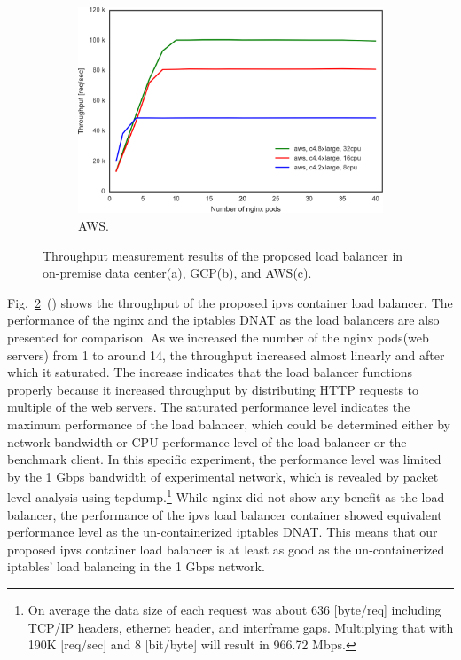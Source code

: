 \begin{figure}[h]
  \begin{subfigure}[t]{\columnwidth}
    \includegraphics[width=0.9\columnwidth]{Figs/aws_c4_ieice}
    \caption{AWS.}
    \label{fig:aws_c4_ieice}
  \end{subfigure}

  \caption{Throughput measurement results of the proposed load balancer in on-premise data center(a), GCP(b), and AWS(c).
}
  \label{fig:ipvs_performance}

\end{figure}


Fig.~\ref{fig:ipvs_performance}~() shows the throughput of the proposed ipvs container load balancer.
The performance of the nginx and the iptables DNAT as the load balancers are also presented for comparison.
As we increased the number of the nginx pods(web servers) from 1 to around 14, the throughput increased almost linearly and after which it saturated.
The increase indicates that the load balancer functions properly because it increased throughput by distributing HTTP requests to multiple of the web servers.
The saturated performance level indicates the maximum performance of the load balancer, which could be determined either by network bandwidth or CPU performance level of the load balancer or the benchmark client.
In this specific experiment, the performance level was limited by the 1 Gbps bandwidth of experimental network\cite{takahashi2018portable}, which is revealed by packet level analysis using tcpdump.\footnote{
On average the data size of each request was about 636 [byte/req] including TCP/IP headers, ethernet header, and interframe gaps.
Multiplying that with 190K [req/sec] and 8 [bit/byte] will result in 966.72 Mbps.
}
While nginx did not show any benefit as the load balancer, the performance of the ipvs load balancer container showed equivalent performance level as the un-containerized iptables DNAT.
This means that our proposed ipvs container load balancer is at least as good as the un-containerized iptables' load balancing in the 1 Gbps network.

